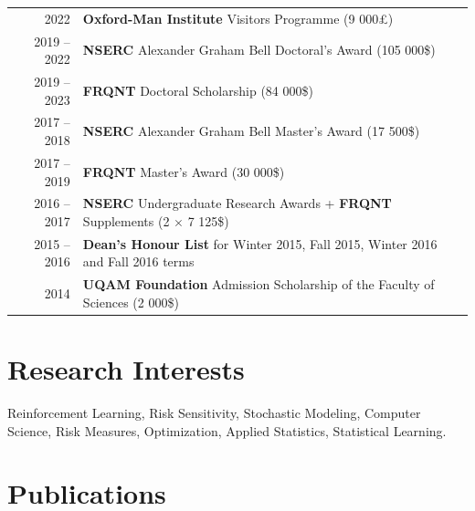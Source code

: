 \documentclass[11pt, sans]{moderncv}
\begin{document}
\begin{longtable}{rp{13.34cm}}
2022 \hspace{10pt}& \textbf{Oxford-Man Institute} Visitors Programme (9 000£)\vspace{2pt}\\
2019 -- 2022 \hspace{10pt}& \textbf{NSERC} \footnotemark[1] Alexander Graham Bell Doctoral's Award (105 000\$)\vspace{2pt}\\
2019 -- 2023 \hspace{10pt}& \textbf{FRQNT} \footnotemark[2] Doctoral Scholarship (84 000\$)\vspace{2pt}\\
2017 -- 2018 \hspace{10pt}& \textbf{NSERC} Alexander Graham Bell Master's Award (17 500\$)\vspace{2pt}\\
2017 -- 2019 \hspace{10pt}& \textbf{FRQNT} Master's Award (30 000\$)\vspace{2pt}\\
2016 -- 2017 \hspace{10pt}& \textbf{NSERC} Undergraduate Research Awards + \textbf{FRQNT} Supplements (2 $\times$ 7 125\$)\vspace{2pt}\\
2015 -- 2016 \hspace{10pt}& \textbf{Dean's Honour List} for Winter 2015, Fall 2015, Winter 2016 and Fall 2016 terms\vspace{2pt}\\
2014 \hspace{10pt}& \textbf{UQAM Foundation} Admission Scholarship of the Faculty of Sciences (2 000\$)\\
\end{longtable}


\section{Research Interests  }

Reinforcement Learning, Risk Sensitivity, Stochastic Modeling, Computer Science, Risk Measures, Optimization, Applied Statistics, Statistical Learning.


\section{Publications  }
\end{document}
